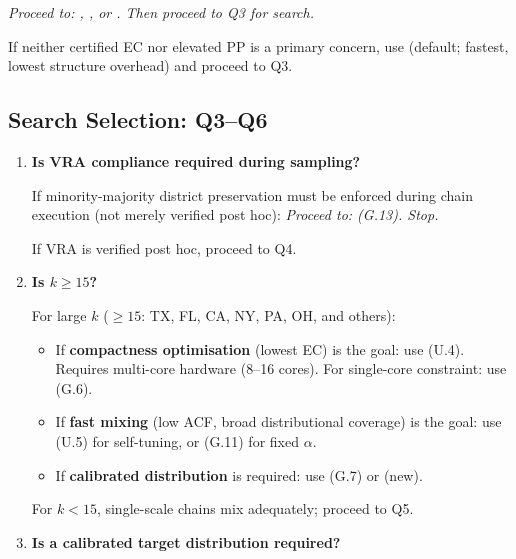 \begin{enumerate}[label=\textbf{Q\arabic*.}]
        \emph{Proceed to: \cvdgeo{}, \cvdg{}, or \bfsgrow{}.
        Then proceed to Q3 for search.}

        If neither certified EC nor elevated PP is a primary concern,
        use \metis{} (default; fastest, lowest structure overhead)
        and proceed to Q3.

\end{enumerate}

\subsection{Search Selection: Q3--Q6}

\begin{enumerate}[label=\textbf{Q\arabic*.},start=3]

  \item \textbf{Is VRA compliance required during sampling?}

        If minority-majority district preservation must be enforced during
        chain execution (not merely verified post hoc):
        \emph{Proceed to: \vra{} (G.13). Stop.}

        If VRA is verified post hoc, proceed to Q4.

  \item \textbf{Is $k \geq 15$?}

        For large $k$ ($\geq 15$: TX, FL, CA, NY, PA, OH, and others):

        \begin{itemize}
          \item If \textbf{compactness optimisation} (lowest EC) is the goal:
                use \pt{} (U.4). Requires multi-core hardware (8--16 cores).
                For single-core constraint: use \sburst{} (G.6).
          \item If \textbf{fast mixing} (low ACF, broad distributional
                coverage) is the goal: use \ams{} (U.5) for self-tuning, or
                \ms{} (G.11) for fixed $\alpha$.
          \item If \textbf{calibrated distribution} is required: use \smc{}
                (G.7) or \smcp{} (new).
        \end{itemize}

        For $k < 15$, single-scale chains mix adequately; proceed to Q5.

  \item \textbf{Is a calibrated target distribution required?}


\end{enumerate}
